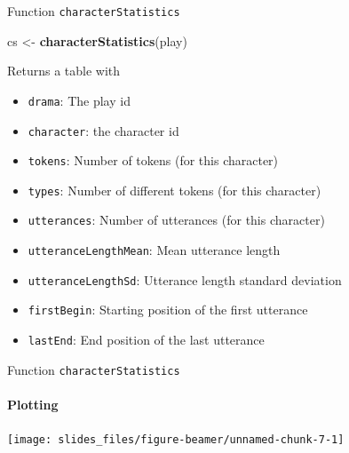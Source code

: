 \documentclass[ignorenonframetext,]{beamer}
\newenvironment{Shaded}{\begin{snugshade}}{\end{snugshade}}
\newcommand{\FloatTok}[1]{\textcolor[rgb]{0.00,0.00,0.81}{#1}}
\newcommand{\KeywordTok}[1]{\textcolor[rgb]{0.13,0.29,0.53}{\textbf{#1}}}
\newcommand{\NormalTok}[1]{#1}
\newcommand{\OperatorTok}[1]{\textcolor[rgb]{0.81,0.36,0.00}{\textbf{#1}}}
\newcommand{\StringTok}[1]{\textcolor[rgb]{0.31,0.60,0.02}{#1}}
\providecommand{\tightlist}{%
  \setlength{\itemsep}{0pt}\setlength{\parskip}{0pt}}
\begin{document}
\begin{frame}[fragile]{Function \texttt{characterStatistics}}
\protect\hypertarget{function-characterstatistics}{}

\begin{Shaded}
\begin{Highlighting}[]
\NormalTok{cs <-}\StringTok{ }\KeywordTok{characterStatistics}\NormalTok{(play)}
\end{Highlighting}
\end{Shaded}

Returns a table with

\begin{itemize}
\tightlist
\item
  \texttt{drama}: The play id
\item
  \texttt{character}: the character id
\item
  \texttt{tokens}: Number of tokens (for this character)
\item
  \texttt{types}: Number of different tokens (for this character)
\item
  \texttt{utterances}: Number of utterances (for this character)
\item
  \texttt{utteranceLengthMean}: Mean utterance length
\item
  \texttt{utteranceLengthSd}: Utterance length standard deviation
\item
  \texttt{firstBegin}: Starting position of the first utterance
\item
  \texttt{lastEnd}: End position of the last utterance
\end{itemize}

\end{frame}

\begin{frame}[fragile]{Function \texttt{characterStatistics}}
\protect\hypertarget{function-characterstatistics-1}{}

\framesubtitle{Plotting}

\begin{Shaded}
\end{Shaded}

\texttt{[image: slides\_files/figure-beamer/unnamed-chunk-7-1]}

\end{frame}
\end{document}
